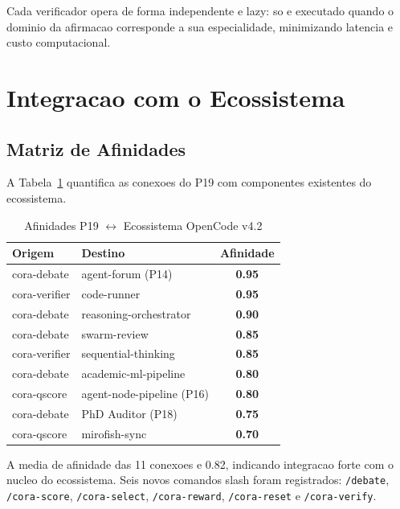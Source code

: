 \documentclass[5p]{elsarticle}
\begin{document}
Cada verificador opera de forma independente e lazy: so e executado quando o dominio da afirmacao corresponde a sua especialidade, minimizando latencia e custo computacional.

\section{Integracao com o Ecossistema}

\subsection{Matriz de Afinidades}

A Tabela~\ref{tab:afin} quantifica as conexoes do P19 com componentes existentes do ecossistema.

\begin{table}[H]
\centering
\begin{tabular}{llc}
\toprule
\textbf{Origem} & \textbf{Destino} & \textbf{Afinidade} \\
\midrule
cora-debate & agent-forum (P14) & \textbf{0.95} \\
cora-verifier & code-runner & \textbf{0.95} \\
cora-debate & reasoning-orchestrator & \textbf{0.90} \\
cora-debate & swarm-review & \textbf{0.85} \\
cora-verifier & sequential-thinking & \textbf{0.85} \\
cora-debate & academic-ml-pipeline & \textbf{0.80} \\
cora-qscore & agent-node-pipeline (P16) & \textbf{0.80} \\
cora-debate & PhD Auditor (P18) & \textbf{0.75} \\
cora-qscore & mirofish-sync & \textbf{0.70} \\
\bottomrule
\end{tabular}
\caption{Afinidades P19 $\leftrightarrow$ Ecossistema OpenCode v4.2}
\label{tab:afin}
\end{table}

A media de afinidade das 11 conexoes e 0.82, indicando integracao forte com o nucleo do ecossistema. Seis novos comandos slash foram registrados: \texttt{/debate}, \texttt{/cora-score}, \texttt{/cora-select}, \texttt{/cora-reward}, \texttt{/cora-reset} e \texttt{/cora-verify}.

\end{document}
